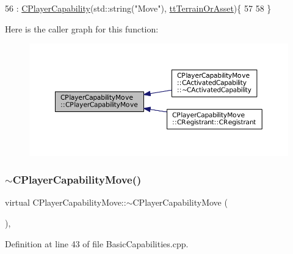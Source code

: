 \begin{DoxyCode}
56                                              : \hyperlink{classCPlayerCapability_a303de62aba5d3f65d9a8e013c64a96c1}{CPlayerCapability}(std::string(\textcolor{stringliteral}{"Move"}), 
      \hyperlink{classCPlayerCapability_a9d3450ed1532fd536bd6cbb1e2eef02fa67cc6d11bc0aafc1b786bd6557ba4aa2}{ttTerrainOrAsset})\{
57 
58 \}
\end{DoxyCode}
Here is the caller graph for this function\+:
\nopagebreak
\begin{figure}[H]
\begin{center}
\leavevmode
\includegraphics[width=350pt]{classCPlayerCapabilityMove_a6bfe72663b6b5fc708d23373dc293ec7_icgraph}
\end{center}
\end{figure}
\hypertarget{classCPlayerCapabilityMove_ab355e3a0f8c82ee10b5ccf95c9e32d89}{}\label{classCPlayerCapabilityMove_ab355e3a0f8c82ee10b5ccf95c9e32d89} 
\subsubsection{\texorpdfstring{$\sim$\+C\+Player\+Capability\+Move()}{~CPlayerCapabilityMove()}}
{\footnotesize\ttfamily virtual C\+Player\+Capability\+Move\+::$\sim$\+C\+Player\+Capability\+Move (\begin{DoxyParamCaption}{ }\end{DoxyParamCaption})\hspace{0.3cm}{\ttfamily [inline]}, {\ttfamily [virtual]}}



Definition at line 43 of file Basic\+Capabilities.\+cpp.


